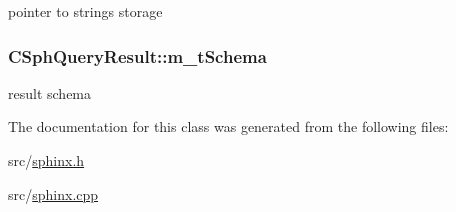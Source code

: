 pointer to strings storage 

\hypertarget{classCSphQueryResult_abc7d673f1775f6e34f2dd1fb1d65e97b}{
\subsubsection[{m\-\_\-t\-Schema}]{ C\-Sph\-Query\-Result\-::m\-\_\-t\-Schema}}\label{classCSphQueryResult_abc7d673f1775f6e34f2dd1fb1d65e97b}


result schema 



The documentation for this class was generated from the following files\-:\begin{DoxyCompactItemize}
\item 
src/\hyperlink{sphinx_8h}{sphinx.\-h}\item 
src/\hyperlink{sphinx_8cpp}{sphinx.\-cpp}\end{DoxyCompactItemize}
